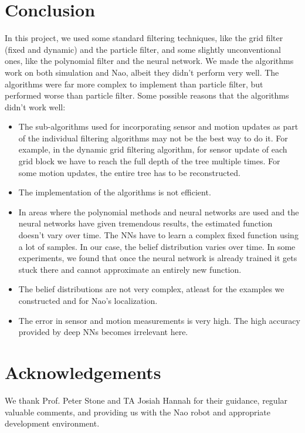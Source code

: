 \documentclass[letterpaper]{article} %
\begin{document}
\section{Conclusion}
In this project, we used some standard filtering techniques, like the grid filter (fixed and dynamic) and the particle filter, and some slightly unconventional ones, like the polynomial filter and the neural network. We made the algorithms work on both simulation and Nao, albeit they didn't perform very well. The algorithms were far more complex to implement than particle filter, but performed worse than particle filter. Some possible reasons that the algorithms didn't work well:
\begin{itemize}
	\item The sub-algorithms used for incorporating sensor and motion updates as part of the individual filtering algorithms may not be the best way to do it. For example, in the dynamic grid filtering algorithm, for sensor update of each grid block we have to reach the full depth of the tree multiple times. For some motion updates, the entire tree has to be reconstructed.
	\item The implementation of the algorithms is not efficient.
	\item In areas where the polynomial methods and neural networks are used and the neural networks have given tremendous results, the estimated function doesn't vary over time. The NNs have to learn a complex fixed function using a lot of samples. In our case, the belief distribution varies over time. In some experiments, we found that once the neural network is already trained it gets stuck there and cannot approximate an entirely new function.
	\item The belief distributions are not very complex, atleast for the examples we constructed and for Nao's localization.
	\item The error in sensor and motion measurements is very high. The high accuracy provided by deep NNs becomes irrelevant here.
\end{itemize}

\section{Acknowledgements}
We thank Prof. Peter Stone and TA Josiah Hannah for their guidance, regular valuable comments, and providing us with the Nao robot and appropriate development environment.





\end{document}
